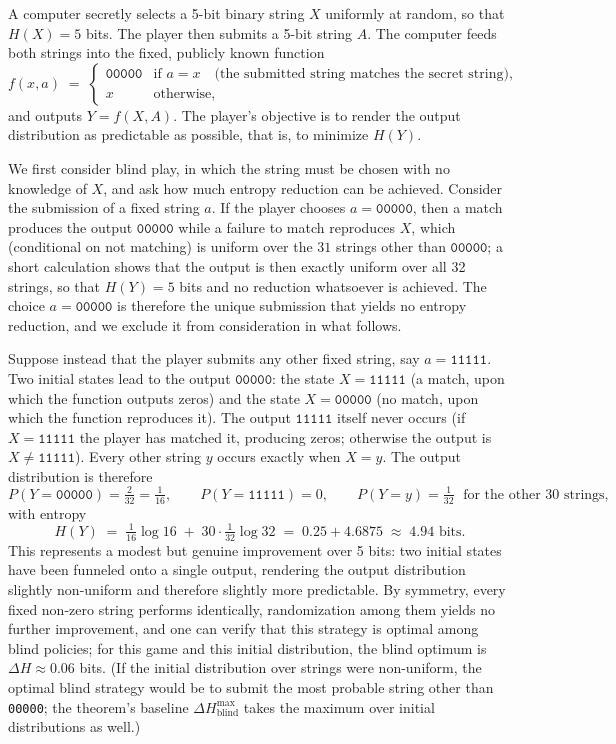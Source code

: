 \documentclass[11pt]{article}
\begin{document}
A computer secretly selects a 5-bit binary string $X$ uniformly at random, so that $H(X) = 5$ bits. The player then submits a 5-bit string $A$. The computer feeds both strings into the fixed, publicly known function
\[
f(x, a) \;=\;
\begin{cases}
\texttt{00000} & \text{if } a = x \quad \text{(the submitted string matches the secret string)},\\[2pt]
x & \text{otherwise},
\end{cases}
\]
and outputs $Y = f(X, A)$. The player's objective is to render the output distribution as predictable as possible, that is, to minimize $H(Y)$.

We first consider blind play, in which the string must be chosen with no knowledge of $X$, and ask how much entropy reduction can be achieved. Consider the submission of a fixed string $a$. If the player chooses $a = \texttt{00000}$, then a match produces the output $\texttt{00000}$ while a failure to match reproduces $X$, which (conditional on not matching) is uniform over the $31$ strings other than $\texttt{00000}$; a short calculation shows that the output is then exactly uniform over all 32 strings, so that $H(Y) = 5$ bits and no reduction whatsoever is achieved. The choice $a = \texttt{00000}$ is therefore the unique submission that yields no entropy reduction, and we exclude it from consideration in what follows.

Suppose instead that the player submits any other fixed string, say $a = \texttt{11111}$. Two initial states lead to the output $\texttt{00000}$: the state $X = \texttt{11111}$ (a match, upon which the function outputs zeros) and the state $X = \texttt{00000}$ (no match, upon which the function reproduces it). The output $\texttt{11111}$ itself never occurs (if $X = \texttt{11111}$ the player has matched it, producing zeros; otherwise the output is $X \ne \texttt{11111}$). Every other string $y$ occurs exactly when $X = y$. The output distribution is therefore
\[
P(Y = \texttt{00000}) = \tfrac{2}{32} = \tfrac1{16}, \qquad
P(Y = \texttt{11111}) = 0, \qquad
P(Y = y) = \tfrac1{32} \;\text{ for the other 30 strings},
\]
with entropy
\[
H(Y) \;=\; \tfrac{1}{16}\log 16 \;+\; 30 \cdot \tfrac{1}{32} \log 32 \;=\; 0.25 + 4.6875 \;\approx\; 4.94 \text{ bits}.
\]
This represents a modest but genuine improvement over 5 bits: two initial states have been funneled onto a single output, rendering the output distribution slightly non-uniform and therefore slightly more predictable. By symmetry, every fixed non-zero string performs identically, randomization among them yields no further improvement, and one can verify that this strategy is optimal among blind policies; for this game and this initial distribution, the blind optimum is $\Delta H \approx 0.06$ bits. (If the initial distribution over strings were non-uniform, the optimal blind strategy would be to submit the most probable string other than \texttt{00000}; the theorem's baseline $\Delta H^{\max}_{\text{blind}}$ takes the maximum over initial distributions as well.)
\end{document}
